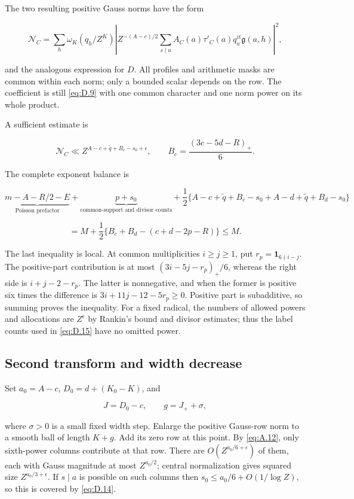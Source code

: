\documentclass[11pt,a4paper]{article}
\begin{document}
The two resulting positive Gauss norms have the form

\[
\mathcal N_C=
\sum_h\omega_K(q_h/Z^K)
\left|Z^{-(A-c)/2}\sum_{s\mid a}A_C(a)\tau'_C(a)q_a^{it}\mathfrak g(a,h)\right|^2,
\tag{D.13}\label{eq:D.13}
\]

and the analogous expression for \(D\). All profiles and arithmetic masks are common within each norm; only a bounded scalar depends on the row. The coefficient is still \eqref{eq:D.9} with one common character and one norm power on its whole product.

A sufficient estimate is

\[
\mathcal N_C\ll Z^{A-c+\widetilde q+B_c-s_0+\epsilon},\qquad
B_c=\frac{(3c-5d-R)_+}{6}.
\tag{D.14}\label{eq:D.14}
\]

The complete exponent balance is

\[
\underbrace{m-A-R/2-E}_{\text{Poisson prefactor}}
+\underbrace{p+s_0}_{\text{common-support and divisor counts}}
+\frac12\{A-c+\widetilde q+B_c-s_0+A-d+\widetilde q+B_d-s_0\}
\]

\[
=M+\frac12\{B_c+B_d-(c+d-2p-R)\}\le M.
\tag{D.15}\label{eq:D.15}
\]

The last inequality is local. At common multiplicities \(i\ge j\ge1\), put \(r_p=\mathbf1_{6\nmid i-j}\). The positive-part contribution is at most \((3i-5j-r_p)_+/6\), whereas the right side is \(i+j-2-r_p\). The latter is nonnegative, and when the former is positive six times the difference is \(3i+11j-12-5r_p\ge0\). Positive part is subadditive, so summing proves the inequality. For a fixed radical, the numbers of allowed powers and allocations are \(Z^\epsilon\) by Rankin's bound and divisor estimates; thus the label counts used in \eqref{eq:D.15} have no omitted power.

\subsection{Second transform and width decrease}\label{sec:D.5}

Set \(a_0=A-c\), \(D_0=d+(K_0-K)\), and

\[
J=D_0-c,\qquad g=J_++\sigma,
\tag{D.16}\label{eq:D.16}
\]

where \(\sigma>0\) is a small fixed width step. Enlarge the positive Gauss-row norm to a smooth ball of length \(K+g\). Add its zero row at this point. By \eqref{eq:A.12}, only sixth-power columns contribute at that row. There are \(O(Z^{a_0/6+\epsilon})\) of them, each with Gauss magnitude at most \(Z^{a_0/2}\); central normalization gives squared size \(Z^{a_0/3+\epsilon}\). If \(s\mid a\) is possible on such columns then \(s_0\le a_0/6+O(1/\log Z)\), so this is covered by \eqref{eq:D.14}.
\end{document}
